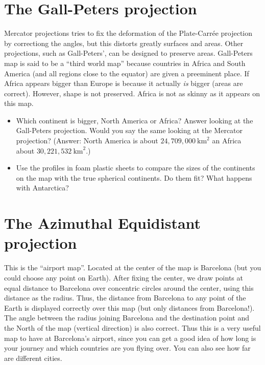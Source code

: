 \documentclass[a4paper,12pt]{article}
\begin{document}
\newpage
\section{The Gall-Peters projection}
Mercator projections tries to fix the deformation of the Plate-Carrée projection by correctiong the angles, but this distorts greatly
surfaces and areas. Other projections, such as Gall-Peters', can be designed to preserve areas. Gall-Peters map is said to be a ``third
world map'' because countries in Africa and South America (and all regions close to the equator) are given a preeminent place. If
Africa appears bigger than Europe is because it actually \emph{is} bigger (areas are correct). However, shape is not preserved. Africa is
not as skinny as it appears on this map.

\begin{itemize}
 \item Which continent is bigger, North America or Africa? Answer looking at the Gall-Peters projection. Would you say the same looking at
the Mercator projection? (Answer: North America is about $24,709,000\ \mathrm{km}^2$ an Africa about $30,221,532\ \mathrm{km}^2$.)

 \item Use the profiles in foam plastic sheets to compare the sizes of the continents on the map with the true spherical continents. Do
them fit? What happens with Antarctica?
\end{itemize}



\newpage
\section{The Azimuthal Equidistant projection}
This is the ``airport map''. Located at the center of the map is Barcelona (but you could choose any point on Earth). After fixing the
center, we draw points at equal distance to Barcelona over concentric circles around the center, using this distance as the radius. Thus,
the distance from Barcelona to any point of the Earth is displayed correctly over this map (but only distances from Barcelona!). The angle
between the radius joining Barcelona and the destination point and the North of the map (vertical direction) is also correct. Thus this is a
very useful map to have at Barcelona's airport, since you can get a good idea of how long is your journey and which countries are you flying
over. You can also see how far are different cities.
\end{document}
